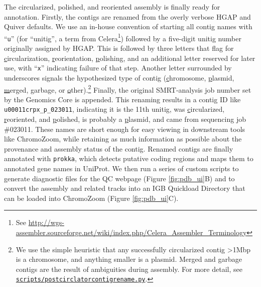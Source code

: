 The circularized, polished, and reoriented assembly is finally ready for annotation. Firstly, the contigs are renamed from the overly verbose HGAP and Quiver defaults. We use an in-house convention of starting all contig names with ``\texttt{u}'' (for ``unitig'', a term from Celera\footnote{See \url{http://wgs-assembler.sourceforge.net/wiki/index.php/Celera_Assembler_Terminology}}) followed by a five-digit unitig number originally assigned by HGAP. This is followed by three letters that flag for \underline{c}ircularization, \underline{r}eorientation, \underline{p}olishing, and an additional letter reserved for later use, with ``\texttt{x}'' indicating failure of that step. Another letter surrounded by underscores signals the hypothesized type of contig (\underline{c}hromosome, \underline{p}lasmid, \underline{m}erged, \underline{g}arbage, or \underline{o}ther).\footnote{We use the simple heuristic that any successfully circularized contig >1Mbp is a chromosome, and anything smaller is a plasmid. Merged and garbage contigs are the result of ambiguities during assembly. For more detail, see \href{https://github.com/powerpak/pathogendb-pipeline/blob/master/scripts/post\textunderscore circlator\textunderscore contig\textunderscore rename.py}{\texttt{scripts/post\textunderscore circlator\textunderscore contig\textunderscore rename.py}}.} Finally, the original SMRT-analysis job number set by the Genomics Core is appended. This renaming results in a contig ID like \verb|u00011crpx_p_023011|, indicating it is the 11th unitig, was \underline{c}ircularized, \underline{r}eoriented, and \underline{p}olished, is probably a \underline{p}lasmid, and came from sequencing job \#023011. These names are short enough for easy viewing in downstream tools like ChromoZoom, while retaining as much information as possible about the provenance and assembly status of the contig. Renamed contigs are finally annotated with \texttt{prokka},\autocite{Seemann2014} which detects putative coding regions and maps them to annotated gene names in UniProt.\autocite{Wasmuth2016} We then run a series of custom scripts to generate diagnostic files for the QC webpage (Figure \ref{fig:pdb_ui}B) and to convert the assembly and related tracks into an IGB Quickload Directory that can be loaded into ChromoZoom (Figure \ref{fig:pdb_ui}C).

